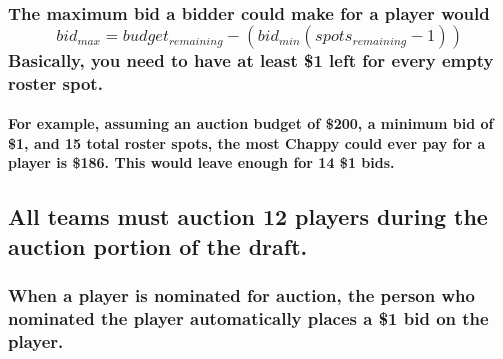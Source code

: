\documentclass[]{book}
\let\oldparagraph\paragraph
\renewcommand{\paragraph}[1]{\oldparagraph{#1}\mbox{}}
\begin{document}
\hypertarget{the-maximum-bid-a-bidder-could-make-for-a-player-would-bid_max-budget_remaining---bid_minspots_remaining---1basically-you-need-to-have-at-least-1-left-for-every-empty-roster-spot.}{%
\subsubsection{\texorpdfstring{The maximum bid a bidder could make for a player would \[bid_{max} = budget_{remaining} - (bid_{min}(spots_{remaining} - 1))\]Basically, you need to have at least \$1 left for every empty roster spot.}{The maximum bid a bidder could make for a player would bid\_\{max\} = budget\_\{remaining\} - (bid\_\{min\}(spots\_\{remaining\} - 1))Basically, you need to have at least \$1 left for every empty roster spot.}}\label{the-maximum-bid-a-bidder-could-make-for-a-player-would-bid_max-budget_remaining---bid_minspots_remaining---1basically-you-need-to-have-at-least-1-left-for-every-empty-roster-spot.}}

\hypertarget{for-example-assuming-an-auction-budget-of-200-a-minimum-bid-of-1-and-15-total-roster-spots-the-most-chappy-could-ever-pay-for-a-player-is-186.-this-would-leave-enough-for-14-1-bids.}{%
\paragraph{For example, assuming an auction budget of \$200, a minimum bid of \$1, and 15 total roster spots, the most Chappy could ever pay for a player is \$186. This would leave enough for 14 \$1 bids.}\label{for-example-assuming-an-auction-budget-of-200-a-minimum-bid-of-1-and-15-total-roster-spots-the-most-chappy-could-ever-pay-for-a-player-is-186.-this-would-leave-enough-for-14-1-bids.}}

\hypertarget{all-teams-must-auction-12-players-during-the-auction-portion-of-the-draft.}{%
\subsection{All teams must auction 12 players during the auction portion of the draft.}\label{all-teams-must-auction-12-players-during-the-auction-portion-of-the-draft.}}

\hypertarget{when-a-player-is-nominated-for-auction-the-person-who-nominated-the-player-automatically-places-a-1-bid-on-the-player.}{%
\subsubsection{When a player is nominated for auction, the person who nominated the player automatically places a \$1 bid on the player.}\label{when-a-player-is-nominated-for-auction-the-person-who-nominated-the-player-automatically-places-a-1-bid-on-the-player.}}
\end{document}
